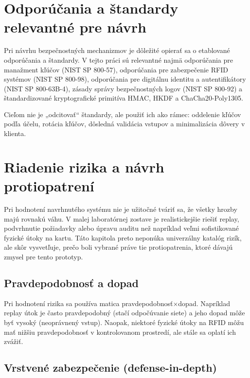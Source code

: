 \documentclass[journal,a4paper,onecolumn]{IEEEtran}
\begin{document}
\section{Odporúčania a štandardy relevantné pre návrh}

Pri návrhu bezpečnostných mechanizmov je dôležité opierať sa o etablované odporúčania a štandardy. V tejto práci sú relevantné najmä odporúčania pre manažment kľúčov (NIST SP 800-57),\cite{NIST80057} odporúčania pre zabezpečenie RFID systémov (NIST SP 800-98),\cite{NIST80098} odporúčania pre digitálnu identitu a autentifikátory (NIST SP 800-63B-4),\cite{NIST80063B4} zásady správy bezpečnostných logov (NIST SP 800-92)\cite{NIST80092} a štandardizované kryptografické primitíva HMAC, HKDF a ChaCha20-Poly1305.\cite{FIPS1981,RFC2104,RFC5869,RFC8439,RFC5116}

Cieľom nie je „odcitovať“ štandardy, ale použiť ich ako rámec: oddelenie kľúčov podľa účelu, rotácia kľúčov, dôsledná validácia vstupov a minimalizácia dôvery v klienta.

\section{Riadenie rizika a návrh protiopatrení}

Pri hodnotení navrhnutého systému nie je užitočné tváriť sa, že všetky hrozby majú rovnakú váhu. V malej laboratórnej zostave je realistickejšie riešiť replay, podvrhnutie požiadavky alebo úpravu auditu než napríklad veľmi sofistikované fyzické útoky na kartu. Táto kapitola preto neponúka univerzálny katalóg rizík, ale skôr vysvetľuje, prečo boli vybrané práve tie protiopatrenia, ktoré dávajú zmysel pre tento prototyp.

\subsection{Pravdepodobnosť a dopad}

Pri hodnotení rizika sa používa matica pravdepodobnosť$\times$dopad. Napríklad replay útok je často pravdepodobný (stačí odpočúvanie siete) a jeho dopad môže byť vysoký (neoprávnený vstup). Naopak, niektoré fyzické útoky na RFID môžu mať nižšiu pravdepodobnosť v kontrolovanom prostredí, ale stále sa oplatí ich zvážiť.

\subsection{Vrstvené zabezpečenie (defense-in-depth)}
\end{document}
